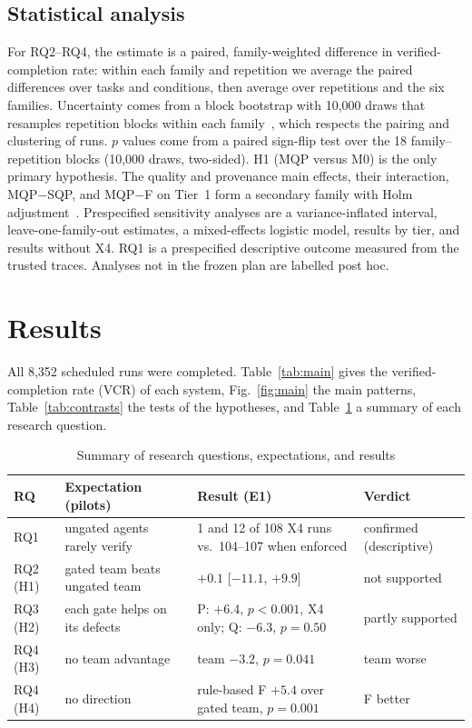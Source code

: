 \documentclass[conference]{IEEEtran}
\newcommand{\sys}[1]{\textsf{#1}}
\begin{document}
\subsection{Statistical analysis}
For RQ2--RQ4, the estimate is a paired, family-weighted difference in verified-completion rate: within each family
and repetition we average the paired differences over tasks and conditions, then average over repetitions and the six
families. Uncertainty comes from a block bootstrap with 10,000 draws that resamples repetition blocks within each
family~\cite{efron1979bootstrap,saravanan2020hierarchical}, which respects the pairing and clustering of runs.
$p$ values come from a paired sign-flip test over the 18 family--repetition blocks (10,000 draws, two-sided). H1
(\sys{MQP} versus \sys{M0}) is the only primary hypothesis. The quality and provenance main effects, their
interaction, \sys{MQP}$-$\sys{SQP}, and \sys{MQP}$-$\sys{F} on Tier~1 form a secondary family with Holm
adjustment~\cite{holm1979}. Prespecified sensitivity analyses are a variance-inflated interval, leave-one-family-out
estimates, a mixed-effects logistic model, results by tier, and results without X4. RQ1 is a prespecified descriptive
outcome measured from the trusted traces. Analyses not in the frozen plan are labelled post hoc.

\section{Results}
\label{sec:results}
All 8,352 scheduled runs were completed. Table~\ref{tab:main} gives the verified-completion rate (VCR) of each system,
Fig.~\ref{fig:main} the main patterns, Table~\ref{tab:contrasts} the tests of the hypotheses, and
Table~\ref{tab:summary} a summary of each research question.

\begin{table}[t]
\caption{Summary of research questions, expectations, and results}
\label{tab:summary}
\centering\footnotesize\setlength{\tabcolsep}{3pt}
\begin{tabular}{@{}p{}p{}p{}p{}@{}}
\toprule
RQ & Expectation (pilots) & Result (E1) & Verdict \\
\midrule
RQ1 & ungated agents rarely verify & 1 and 12 of 108 X4 runs vs.\ 104--107 when enforced & confirmed (descriptive) \\
RQ2 (H1) & gated team beats ungated team & $+0.1$ [$-11.1$, $+9.9$] & not supported \\
RQ3 (H2) & each gate helps on its defects & P: $+6.4$, $p<0.001$, X4 only; Q: $-6.3$, $p=0.50$ & partly supported \\
RQ4 (H3) & no team advantage & team $-3.2$, $p=0.041$ & team worse \\
RQ4 (H4) & no direction & rule-based \sys{F} $+5.4$ over gated team, $p=0.001$ & \sys{F} better \\
\bottomrule
\end{tabular}
\end{table}
\end{document}
